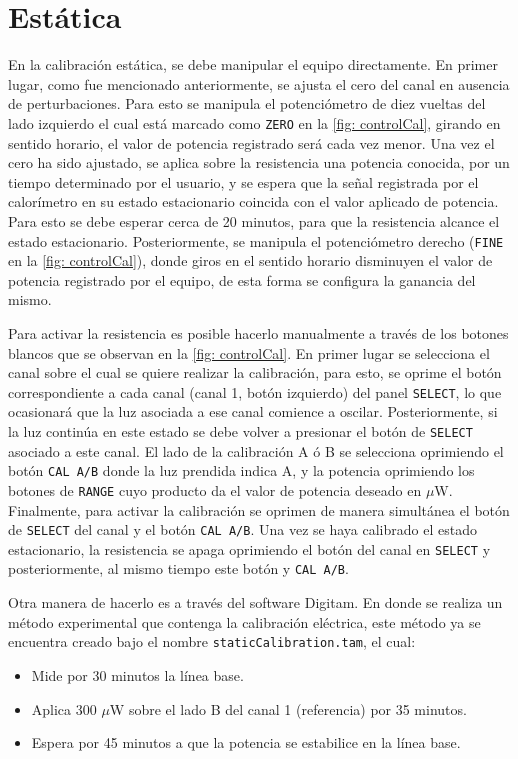 	\section{Est\'atica}
	En la calibración estática, se debe manipular el equipo directamente. En primer lugar, como fue mencionado anteriormente, se ajusta el cero del canal en ausencia de perturbaciones. Para esto se manipula el potenciómetro de diez vueltas del lado izquierdo el cual está marcado como \texttt{ZERO} en la \autoref{fig: controlCal}, girando en sentido horario, el valor de potencia registrado será cada vez menor. Una vez el cero ha sido ajustado, se aplica sobre la resistencia una potencia conocida, por un tiempo determinado por el usuario, y se espera que la señal registrada por el calorímetro en su estado estacionario coincida con el valor aplicado de potencia. Para esto se debe esperar cerca de 20 minutos, para que la resistencia alcance el estado estacionario. Posteriormente, se manipula el potenciómetro derecho (\texttt{FINE} en la \autoref{fig: controlCal}), donde giros en el sentido horario disminuyen el valor de potencia registrado por el equipo, de esta forma se configura la ganancia del mismo.

	Para activar la resistencia es posible hacerlo manualmente a través de los botones blancos que se observan en la \autoref{fig: controlCal}. En primer lugar se selecciona el canal sobre el cual se quiere realizar la calibración, para esto, se oprime el botón correspondiente a cada canal (canal 1, botón izquierdo) del panel \texttt{SELECT}, lo que ocasionará que la luz asociada a ese canal comience a oscilar. Posteriormente, si la luz continúa en este estado se debe volver a presionar el botón de \texttt{SELECT} asociado a este canal. El lado de la calibración A ó B se selecciona oprimiendo el botón \texttt{CAL A/B} donde la luz prendida indica A, y la potencia oprimiendo los botones de \texttt{RANGE} cuyo producto da el valor de potencia deseado en $\mu$W. Finalmente, para activar la calibración se oprimen de manera simultánea el botón de \texttt{SELECT} del canal y el botón \texttt{CAL A/B}. Una vez se haya calibrado el estado estacionario, la resistencia se apaga oprimiendo el botón del canal en \texttt{SELECT} y posteriormente, al mismo tiempo este botón y \texttt{CAL A/B}.
	
	Otra manera de hacerlo es a través del software Digitam. En donde se realiza un método experimental que contenga la calibración eléctrica, este método ya se encuentra creado bajo el nombre \texttt{staticCalibration.tam}, el cual:
	\begin{itemize}
		\item Mide por 30 minutos la línea base.
		\item Aplica 300 $\mu$W sobre el lado B del canal 1 (referencia) por 35 minutos.
		\item Espera por 45 minutos a que la potencia se estabilice en la línea base.
	\end{itemize}

